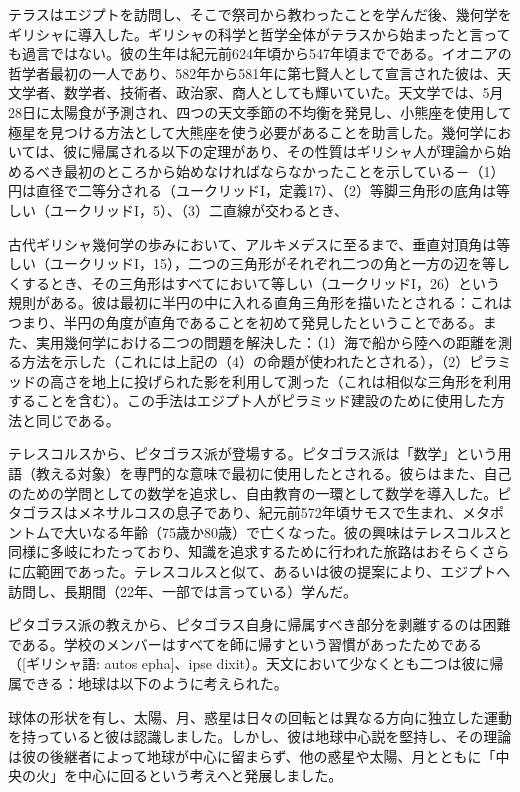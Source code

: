 \documentclass[a4paper,11pt,openany]{ltjsbook}
\begin{document}
テラスはエジプトを訪問し、そこで祭司から教わったことを学んだ後、幾何学をギリシャに導入した。ギリシャの科学と哲学全体がテラスから始まったと言っても過言ではない。彼の生年は紀元前624年頃から547年頃までである。イオニアの哲学者最初の一人であり、582年から581年に第七賢人として宣言された彼は、天文学者、数学者、技術者、政治家、商人としても輝いていた。天文学では、5月28日に太陽食が予測され、四つの天文季節の不均衡を発見し、小熊座を使用して極星を見つける方法として大熊座を使う必要があることを助言した。幾何学においては、彼に帰属される以下の定理があり、その性質はギリシャ人が理論から始めるべき最初のところから始めなければならなかったことを示している－（1）円は直径で二等分される（ユークリッドI，定義17）、（2）等脚三角形の底角は等しい（ユークリッドI，5）、（3）二直線が交わるとき、

古代ギリシャ幾何学の歩みにおいて、アルキメデスに至るまで、垂直対頂角は等しい（ユークリッドI，15），二つの三角形がそれぞれ二つの角と一方の辺を等しくするとき、その三角形はすべてにおいて等しい（ユークリッドI，26）という規則がある。彼は最初に半円の中に入れる直角三角形を描いたとされる：これはつまり、半円の角度が直角であることを初めて発見したということである。また、実用幾何学における二つの問題を解決した：（1）海で船から陸への距離を測る方法を示した（これには上記の（4）の命題が使われたとされる），（2）ピラミッドの高さを地上に投げられた影を利用して測った（これは相似な三角形を利用することを含む）。この手法はエジプト人がピラミッド建設のために使用した方法と同じである。

テレスコルスから、ピタゴラス派が登場する。ピタゴラス派は「数学」という用語（教える対象）を専門的な意味で最初に使用したとされる。彼らはまた、自己のための学問としての数学を追求し、自由教育の一環として数学を導入した。ピタゴラスはメネサルコスの息子であり、紀元前572年頃サモスで生まれ、メタポントムで大いなる年齢（75歳か80歳）で亡くなった。彼の興味はテレスコルスと同様に多岐にわたっており、知識を追求するために行われた旅路はおそらくさらに広範囲であった。テレスコルスと似て、あるいは彼の提案により、エジプトへ訪問し、長期間（22年、一部では言っている）学んだ。

ピタゴラス派の教えから、ピタゴラス自身に帰属すべき部分を剥離するのは困難である。学校のメンバーはすべてを師に帰すという習慣があったためである（[ギリシャ語: autos epha]、ipse dixit）。天文において少なくとも二つは彼に帰属できる：地球は以下のように考えられた。

球体の形状を有し、太陽、月、惑星は日々の回転とは異なる方向に独立した運動を持っていると彼は認識しました。しかし、彼は地球中心説を堅持し、その理論は彼の後継者によって地球が中心に留まらず、他の惑星や太陽、月とともに「中央の火」を中心に回るという考えへと発展しました。
\end{document}
